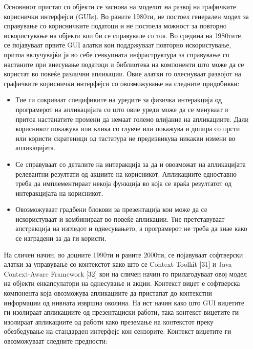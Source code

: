 Основниот пристап со објекти се
заснова на моделот на развој на графичките кориснички интерфејси (GUIs). Во
раните 1980ти, не постоел генерален модел за справување со корисничките податоци
и не постоела можност за повторно искористување на објекти кои би се справувале
со тоа. Во средина на 1980тите, се појавуваат првите GUI алатки кои поддржуваат
повторно искористување, притоа вклучувајќи ја во себе севкупната инфраструктура
за справување со настаните при внесување податоци и библиотека на компоненти што
може да се користат во повеќе различни апликации. Овие алатки го олеснуваат
развојот на графичките кориснички интерфејси со овозможување на следните
придобивки:

\begin{itemize}
  \item Тие ги сокриваат спецификите на уредите за физичка интеракција
од програмерот на апликацијата со што овие уреди може да се менуваат и притоа
настанатите промени да немаат големо влијание на апликациите. Дали корисникот
покажува или клика со глувче или покажува и допира со прсти или користи
скратеници од тастатура не предизвикува никакви измени во апликацијата.
\item Се справуваат со деталите на интеракција за да и овозможат на апликацијата
релевантни резултати од акциите на корисникот. Апликациите едноставно треба да
имплементираат некоја функција во која се враќа резултатот од интеракцијата на
корисникот.
\item Овозможуваат градбени блокови за презентација кои може да се
искористуваат и комбинираат во повеќе апликации. Тие претставуваат апстракција
на изгледот и однесувањето, а програмерот не треба да знае како се изградени за
да ги користи.
\end{itemize}

На сличен начин, во доцните 1990ти и раните 2000ти, се појавуваат софтверски
алатки за управување со контекстот како што се Context Toolkit [31] и Java
Context-Aware Framework [32] кои на сличен начин го прилагодуваат овој модел на
објекти енкапсулатори на однесување и акции. Контекст виџет е софтверска
компонента која овозможува апликациите да пристапат до контекстни информации од
нивната извршна околина. На ист начин како што GUI виџетите ги изолираат
апликациите од презентациски работи, така контекст виџетите ги изолираат
апликациите од работи како преземање на контекстот преку обезбедување на
стандарден интерфејс кон сензорите. Контекст виџетите ги овозможуваат следните
предности:

